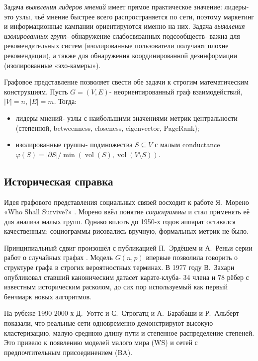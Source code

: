 \documentclass[14pt,a4paper]{extarticle}
\begin{document}
Задача \emph{выявления лидеров мнений} имеет прямое практическое значение: лидеры- это узлы, чьё мнение быстрее всего распространяется по сети, поэтому маркетинг и информационные кампании ориентируются именно на них. Задача \emph{выявления изолированных групп}- обнаружение слабосвязанных подсообществ- важна для рекомендательных систем (изолированные пользователи получают плохие рекомендации), а также для обнаружения координированной дезинформации (изолированные «эхо-камеры»).

Графовое представление позволяет свести обе задачи к строгим математическим конструкциям. Пусть $G = (V, E)$- неориентированный граф взаимодействий, $|V| = n$, $|E| = m$. Тогда:
\begin{itemize}
\item лидеры мнений- узлы с наибольшими значениями метрик центральности (степенной, betweenness, closeness, eigenvector, PageRank);
\item изолированные группы- подмножества $S \subseteq V$ с малым conductance $\varphi(S) = |\partial S|/\min(\operatorname{vol}(S), \operatorname{vol}(V \setminus S))$.
\end{itemize}

\subsection{Историческая справка}

Идея графового представления социальных связей восходит к работе Я.~Морено «Who Shall Survive?» \cite{moreno1934}. Морено ввёл понятие \emph{социограммы} и стал применять её для анализа малых групп. Однако вплоть до 1950-х годов аппарат оставался качественным: социограммы рисовались вручную, формальных метрик не было.

Принципиальный сдвиг произошёл с публикацией П.~Эрдёшем и А.~Реньи серии работ о случайных графах \cite{erdos1959}. Модель $G(n, p)$ впервые позволила говорить о структуре графа в строгих вероятностных терминах. В 1977 году В.~Захари \cite{zachary1977} опубликовал ставший каноническим датасет карате-клуба- 34 члена и 78 рёбер с известным историческим расколом, до сих пор используемый как первый бенчмарк новых алгоритмов.

На рубеже 1990-2000-х Д.~Уоттс и С.~Строгатц \cite{watts1998} и А.~Барабаши и Р.~Альберт \cite{barabasi1999} показали, что реальные сети одновременно демонстрируют высокую кластеризацию, малую среднюю длину пути и степенное распределение степеней. Это привело к появлению моделей малого мира (WS) и сетей с предпочтительным присоединением (BA).
\end{document}
